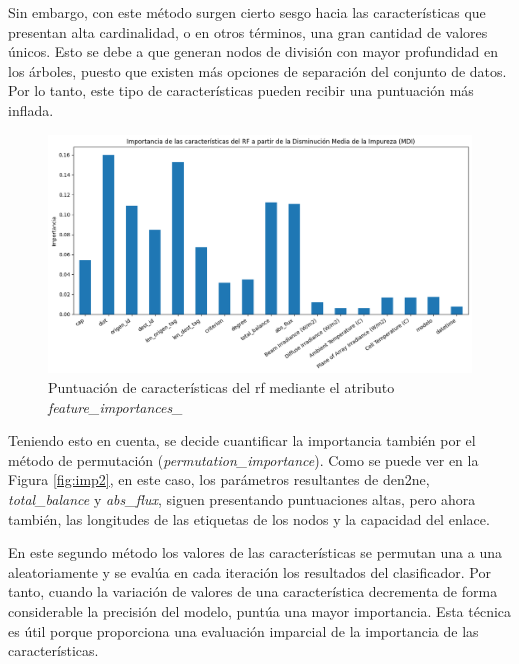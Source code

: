 Sin embargo, con este método surgen cierto sesgo hacia las características que presentan alta cardinalidad, o en otros términos, una gran cantidad de valores únicos. Esto se debe a que generan nodos de división con mayor profundidad en los árboles, puesto que existen más opciones de separación del conjunto de datos. Por lo tanto, este tipo de características pueden recibir una puntuación más inflada.

\vspace{3mm}

\begin{figure}[H]
  \centering
  \includegraphics[width=1\textwidth]{img/desarrollo/rf/importance1.png}
  \caption{Puntuación de características del \acrshort{rf} mediante el atributo \textit{feature\_importances\_}}
  \label{fig:imp1}
\end{figure}

\vspace{3mm}

Teniendo esto en cuenta, se decide cuantificar la importancia también por el método de permutación (\textit{permutation\_importance}). Como se puede ver en la Figura \ref{fig:imp2}, en este caso, los parámetros resultantes de \gls{den2ne}, \textit{total\_balance} y \textit{abs\_flux}, siguen presentando puntuaciones altas, pero ahora también, las longitudes de las etiquetas de los nodos y la capacidad del enlace. \cite{importance}

\vspace{4mm}

En este segundo método los valores de las características se permutan una a una aleatoriamente y se evalúa en cada iteración los resultados del clasificador. Por tanto, cuando la variación de valores de una característica decrementa de forma considerable la precisión del modelo, puntúa una mayor importancia. Esta técnica es útil porque proporciona una evaluación imparcial de la importancia de las características. 


